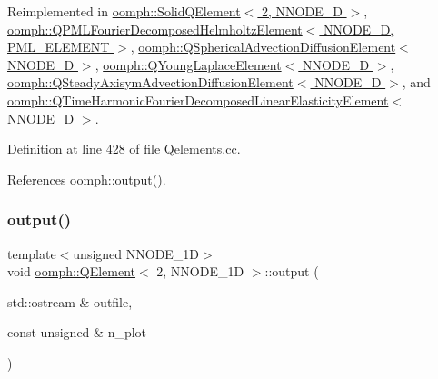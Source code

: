 Reimplemented in \hyperlink{classoomph_1_1SolidQElement_3_012_00_01NNODE__1D_01_4_a849d3059d7f4e6080bc889f1acb381dd}{oomph\+::\+Solid\+Q\+Element$<$ 2, N\+N\+O\+D\+E\+\_\+D $>$}, \hyperlink{classoomph_1_1QPMLFourierDecomposedHelmholtzElement_a27085df03fa3b5bc7a0bf02cd18808ed}{oomph\+::\+Q\+P\+M\+L\+Fourier\+Decomposed\+Helmholtz\+Element$<$ N\+N\+O\+D\+E\+\_\+D, P\+M\+L\+\_\+\+E\+L\+E\+M\+E\+N\+T $>$}, \hyperlink{classoomph_1_1QSphericalAdvectionDiffusionElement_addf1f59cc684120c3063774ce75a72a4}{oomph\+::\+Q\+Spherical\+Advection\+Diffusion\+Element$<$ N\+N\+O\+D\+E\+\_\+D $>$}, \hyperlink{classoomph_1_1QYoungLaplaceElement_acd3dd1655fe2b9fd060a15ab9116eeae}{oomph\+::\+Q\+Young\+Laplace\+Element$<$ N\+N\+O\+D\+E\+\_\+D $>$}, \hyperlink{classoomph_1_1QSteadyAxisymAdvectionDiffusionElement_acb9de208b63774c2ea96c1bcab916212}{oomph\+::\+Q\+Steady\+Axisym\+Advection\+Diffusion\+Element$<$ N\+N\+O\+D\+E\+\_\+D $>$}, and \hyperlink{classoomph_1_1QTimeHarmonicFourierDecomposedLinearElasticityElement_a8d2c88dba3a246693ba43bab9d84fbd8}{oomph\+::\+Q\+Time\+Harmonic\+Fourier\+Decomposed\+Linear\+Elasticity\+Element$<$ N\+N\+O\+D\+E\+\_\+D $>$}.



Definition at line 428 of file Qelements.\+cc.



References oomph\+::output().

\mbox{\label{classoomph_1_1QElement_3_012_00_01NNODE__1D_01_4_a865e3a77ee4cb67e7fcd7eca42d256f1}} 
\subsubsection{\texorpdfstring{output()}{output()}\hspace{0.1cm}{\footnotesize\ttfamily [2/4]}}
{\footnotesize\ttfamily template$<$unsigned N\+N\+O\+D\+E\+\_\+1D$>$ \\
void \hyperlink{classoomph_1_1QElement}{oomph\+::\+Q\+Element}$<$ 2, N\+N\+O\+D\+E\+\_\+1D $>$\+::output (\begin{DoxyParamCaption}\item[{std\+::ostream \&}]{outfile,  }\item[{const unsigned \&}]{n\+\_\+plot }\end{DoxyParamCaption})\hspace{0.3cm}{\ttfamily [virtual]}}



